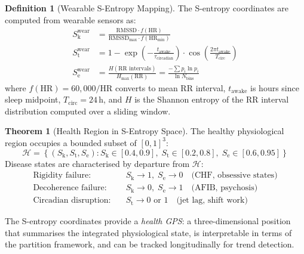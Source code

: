 \documentclass[10pt,twocolumn,a4paper]{article}
\theoremstyle{definition}
\newtheorem{theorem}{Theorem}
\newtheorem{definition}{Definition}
\newcommand{\SE}{S_{\text{e}}}
\newcommand{\SK}{S_{\text{k}}}
\newcommand{\ST}{S_{\text{t}}}
\begin{document}
\begin{definition}[Wearable S-Entropy Mapping]
\label{def:sentropy_wearable}
The S-entropy coordinates are computed from wearable sensors as:
\begin{align}
\SK^{\text{wear}} &= \frac{\text{RMSSD} \cdot f(\text{HR})}
{\text{RMSSD}_{\max} \cdot f(\text{HR}_{\min})}
\label{eq:sk_wear}\\
\ST^{\text{wear}} &= 1 - \exp\!\left(-\frac{t_{\text{awake}}}
{\tau_{\text{circadian}}}\right)
\cdot \cos\!\left(\frac{2\pi t_{\text{awake}}}{T_{\text{circ}}}\right)
\label{eq:st_wear}\\
\SE^{\text{wear}} &= \frac{H(\text{RR intervals})}{H_{\max}(\text{RR})}
= \frac{-\sum p_i \ln p_i}{\ln N_{\text{bins}}}
\label{eq:se_wear}
\end{align}
where $f(\text{HR}) = 60{,}000/\text{HR}$ converts to mean RR interval,
$t_{\text{awake}}$ is hours since sleep midpoint,
$T_{\text{circ}} = 24$\,h, and $H$ is the Shannon entropy of the
RR interval distribution computed over a sliding window.
\end{definition}

\begin{theorem}[Health Region in S-Entropy Space]
\label{thm:health_region}
The healthy physiological region occupies a bounded subset of
$[0,1]^3$:
\begin{equation}
\label{eq:health_region}
\mathcal{H} = \left\{(\SK, \ST, \SE) :
\SK \in [0.4, 0.9],\;
\ST \in [0.2, 0.8],\;
\SE \in [0.6, 0.95]\right\}
\end{equation}
Disease states are characterised by departure from $\mathcal{H}$:
\begin{align}
\text{Rigidity failure:}\quad & \SK \to 1,\; \SE \to 0
\quad \text{(CHF, obsessive states)}\\
\text{Decoherence failure:}\quad & \SK \to 0,\; \SE \to 1
\quad \text{(AFIB, psychosis)}\\
\text{Circadian disruption:}\quad & \ST \to 0\text{ or }1
\quad \text{(jet lag, shift work)}
\end{align}
\end{theorem}

The S-entropy coordinates provide a \emph{health GPS}: a
three-dimensional position that summarises the integrated physiological
state, is interpretable in terms of the partition framework, and can
be tracked longitudinally for trend detection.
\end{document}
